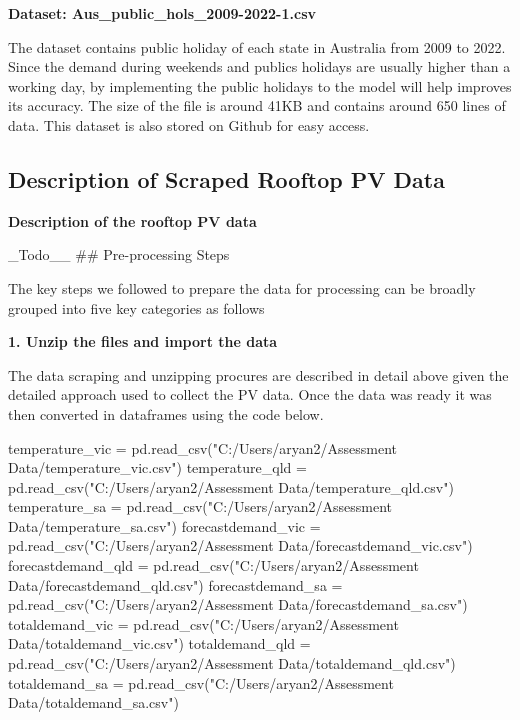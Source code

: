 \documentclass[
]{article}
\newenvironment{Shaded}{}{}
\newcommand{\NormalTok}[1]{#1}
\newcommand{\OperatorTok}[1]{\textcolor[rgb]{0.40,0.40,0.40}{#1}}
\newcommand{\StringTok}[1]{\textcolor[rgb]{0.25,0.44,0.63}{#1}}
\begin{document}
\textbf{Dataset: Aus\_public\_hols\_2009-2022-1.csv}

The dataset contains public holiday of each state in Australia from 2009
to 2022. Since the demand during weekends and publics holidays are
usually higher than a working day, by implementing the public holidays
to the model will help improves its accuracy. The size of the file is
around 41KB and contains around 650 lines of data. This dataset is also
stored on Github for easy access.

\subsection{Description of Scraped Rooftop PV
Data}\label{description-of-scraped-rooftop-pv-data}

\textbf{Description of the rooftop PV data}

\_Todo\_\_ \#\# Pre-processing Steps

The key steps we followed to prepare the data for processing can be
broadly grouped into five key categories as follows

\textbf{1. Unzip the files and import the data}

The data scraping and unzipping procures are described in detail above
given the detailed approach used to collect the PV data. Once the data
was ready it was then converted in dataframes using the code below.

\begin{Shaded}
\begin{Highlighting}[]
\NormalTok{temperature\_vic }\OperatorTok{=}\NormalTok{ pd.read\_csv(}\StringTok{"C:/Users/aryan2/Assessment Data/temperature\_vic.csv"}\NormalTok{)}
\NormalTok{temperature\_qld }\OperatorTok{=}\NormalTok{ pd.read\_csv(}\StringTok{"C:/Users/aryan2/Assessment Data/temperature\_qld.csv"}\NormalTok{)}
\NormalTok{temperature\_sa }\OperatorTok{=}\NormalTok{ pd.read\_csv(}\StringTok{"C:/Users/aryan2/Assessment Data/temperature\_sa.csv"}\NormalTok{)}
\NormalTok{forecastdemand\_vic }\OperatorTok{=}\NormalTok{ pd.read\_csv(}\StringTok{"C:/Users/aryan2/Assessment Data/forecastdemand\_vic.csv"}\NormalTok{)}
\NormalTok{forecastdemand\_qld }\OperatorTok{=}\NormalTok{ pd.read\_csv(}\StringTok{"C:/Users/aryan2/Assessment Data/forecastdemand\_qld.csv"}\NormalTok{)}
\NormalTok{forecastdemand\_sa }\OperatorTok{=}\NormalTok{ pd.read\_csv(}\StringTok{"C:/Users/aryan2/Assessment Data/forecastdemand\_sa.csv"}\NormalTok{)}
\NormalTok{totaldemand\_vic }\OperatorTok{=}\NormalTok{ pd.read\_csv(}\StringTok{"C:/Users/aryan2/Assessment Data/totaldemand\_vic.csv"}\NormalTok{)}
\NormalTok{totaldemand\_qld }\OperatorTok{=}\NormalTok{ pd.read\_csv(}\StringTok{"C:/Users/aryan2/Assessment Data/totaldemand\_qld.csv"}\NormalTok{)}
\NormalTok{totaldemand\_sa }\OperatorTok{=}\NormalTok{ pd.read\_csv(}\StringTok{"C:/Users/aryan2/Assessment Data/totaldemand\_sa.csv"}\NormalTok{)}
\end{Highlighting}
\end{Shaded}
\end{document}
